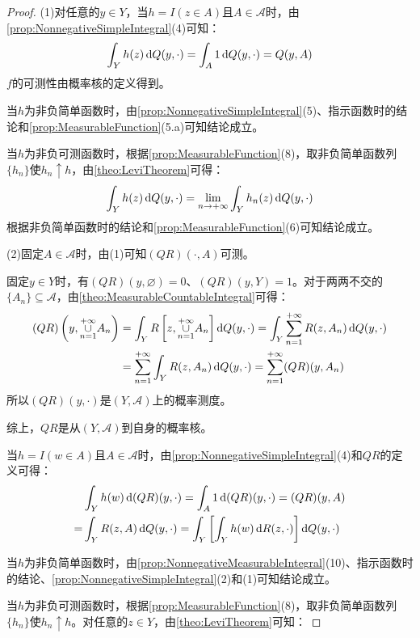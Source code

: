 \begin{proof}
	(1)对任意的$y\in Y$，当$h=I(z\in A)$且$A\in\mathscr{A}$时，由\cref{prop:NonnegativeSimpleIntegral}(4)可知：
	\begin{equation*}
		\int_{Y}h(z)\mathop{}\!\mathrm{d} Q(y,\cdot)=\int_{A}1\mathop{}\!\mathrm{d} Q(y,\cdot)=Q(y,A)
	\end{equation*}
	$f$的可测性由概率核的定义得到。\par
	当$h$为非负简单函数时，由\cref{prop:NonnegativeSimpleIntegral}(5)、指示函数时的结论和\cref{prop:MeasurableFunction}(5.a)可知结论成立。\par
	当$h$为非负可测函数时，根据\cref{prop:MeasurableFunction}(8)，取非负简单函数列$\{h_n\}$使$h_n\uparrow h$，由\cref{theo:LeviTheorem}可得：
	\begin{equation*}
		\int_{Y}h(z)\mathop{}\!\mathrm{d} Q(y,\cdot)=\lim_{n\to+\infty}\int_{Y}h_n(z)\mathop{}\!\mathrm{d} Q(y,\cdot)
	\end{equation*}
	根据非负简单函数时的结论和\cref{prop:MeasurableFunction}(6)可知结论成立。\par
	(2)固定$A\in\mathscr{A}$时，由(1)可知$(QR)(\cdot,A)$可测。\par
	固定$y\in Y$时，有$(QR)(y,\varnothing)=0$、$(QR)(y,Y)=1$。对于两两不交的$\{A_n\}\subseteq\mathscr{A}$，由\cref{theo:MeasurableCountableIntegral}可得：
	\begin{align*}
		(QR)\left(y,\underset{n=1}{\overset{+\infty}{\cup}}A_n\right)&=\int_{Y}R\left[z,\underset{n=1}{\overset{+\infty}{\cup}}A_n\right]\mathop{}\!\mathrm{d} Q(y,\cdot)=\int_{Y}\sum_{n=1}^{+\infty}R(z,A_n)\mathop{}\!\mathrm{d} Q(y,\cdot) \\
		&=\sum_{n=1}^{+\infty}\int_{Y}R(z,A_n)\mathop{}\!\mathrm{d} Q(y,\cdot)=\sum_{n=1}^{+\infty}(QR)(y,A_n)
	\end{align*}
	所以$(QR)(y,\cdot)$是$(Y,\mathscr{A})$上的概率测度。\par
	综上，$QR$是从$(Y,\mathscr{A})$到自身的概率核。\par
	当$h=I(w\in A)$且$A\in\mathscr{A}$时，由\cref{prop:NonnegativeSimpleIntegral}(4)和$QR$的定义可得：
	\begin{align*}
		&\int_{Y}h(w)\mathop{}\!\mathrm{d}(QR)(y,\cdot)=\int_{A}1\mathop{}\!\mathrm{d}(QR)(y,\cdot)=(QR)(y,A) \\
		=&\int_{Y}R(z,A)\mathop{}\!\mathrm{d} Q(y,\cdot)=\int_{Y}\left[\int_{Y}h(w)\mathop{}\!\mathrm{d} R(z,\cdot)\right]\mathop{}\!\mathrm{d} Q(y,\cdot)
	\end{align*}\par
	当$h$为非负简单函数时，由\cref{prop:NonnegativeMeasurableIntegral}(10)、指示函数时的结论、\cref{prop:NonnegativeSimpleIntegral}(2)和(1)可知结论成立。\par
	当$h$为非负可测函数时，根据\cref{prop:MeasurableFunction}(8)，取非负简单函数列$\{h_n\}$使$h_n\uparrow h$。对任意的$z\in Y$，由\cref{theo:LeviTheorem}可知：

\end{proof}
